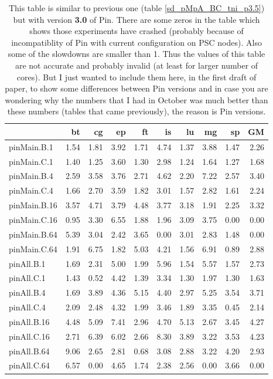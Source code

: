\begin{table*}[]

\caption{This table is similar to previous one (table \ref{sd_pMpA_BC_tni_p3.5}) but with version \textbf{3.0} of Pin. There are some zeros in the table which shows those experiments have crashed (probably because of incompatiblity of Pin with current configuration on PSC nodes). Also some of the slowdowns are smaller than 1. Thus the values of this table are not accurate and probably invalid (at least for larger number of cores). But I just wanted to include them here, in the first draft of paper, to show some differences between Pin versions and in case you are wondering why the numbers that I had in October was much better than these numbers (tables that came previously), the reason is Pin versions.}
\label{sd_pMpA_BC_tni_p3.0}
\begin{center}
\begin{tabular}{|l|rrrrrrrr|r|}
\hline
              &   bt &   cg &   ep &   ft &   is &   lu &   mg &   sp &   GM \\
\hline
 pinMain.B.1  & 1.54 & 1.81 & 3.92 & 1.71 & 4.74 & 1.37 & 3.88 & 1.47 & 2.26 \\
 pinMain.C.1  & 1.40 & 1.25 & 3.60 & 1.30 & 2.98 & 1.24 & 1.64 & 1.27 & 1.68 \\
 \hline
 pinMain.B.4  & 2.59 & 3.58 & 3.76 & 2.71 & 4.62 & 2.20 & 7.22 & 2.57 & 3.40 \\
 pinMain.C.4  & 1.66 & 2.70 & 3.59 & 1.82 & 3.01 & 1.57 & 2.82 & 1.61 & 2.24 \\
 \hline
 pinMain.B.16 & 3.57 & 4.71 & 3.79 & 4.48 & 3.77 & 3.18 & 1.91 & 2.25 & 3.32 \\
 pinMain.C.16 & 0.95 & 3.30 & 6.55 & 1.88 & 1.96 & 3.09 & 3.75 & 0.00 & 0.00 \\
 \hline
 pinMain.B.64 & 5.39 & 3.04 & 2.42 & 3.65 & 0.00 & 3.01 & 2.83 & 1.48 & 0.00 \\
 pinMain.C.64 & 1.91 & 6.75 & 1.82 & 5.03 & 4.21 & 1.56 & 6.91 & 0.89 & 2.88 \\
 \hline
 pinAll.B.1   & 1.69 & 2.31 & 5.00 & 1.99 & 5.96 & 1.54 & 5.57 & 1.57 & 2.73 \\
 pinAll.C.1   & 1.43 & 0.52 & 4.42 & 1.39 & 3.34 & 1.30 & 1.97 & 1.30 & 1.63 \\
 \hline
 pinAll.B.4   & 1.69 & 3.89 & 4.36 & 5.15 & 4.40 & 2.97 & 5.25 & 3.54 & 3.71 \\
 pinAll.C.4   & 2.09 & 2.48 & 4.32 & 1.99 & 3.46 & 1.89 & 3.35 & 0.45 & 2.14 \\
 \hline
 pinAll.B.16  & 4.48 & 5.09 & 7.41 & 2.96 & 4.70 & 5.13 & 2.67 & 3.45 & 4.27 \\
 pinAll.C.16  & 2.71 & 6.39 & 6.02 & 2.66 & 8.30 & 3.89 & 3.22 & 3.53 & 4.23 \\
 \hline
 pinAll.B.64  & 9.06 & 2.65 & 2.81 & 0.68 & 3.08 & 2.88 & 3.22 & 4.20 & 2.93 \\
 pinAll.C.64  & 6.57 & 0.00 & 4.65 & 1.74 & 2.38 & 2.56 & 0.00 & 3.66 & 0.00 \\
\hline
\end{tabular}
\end{center}
\end{table*}
